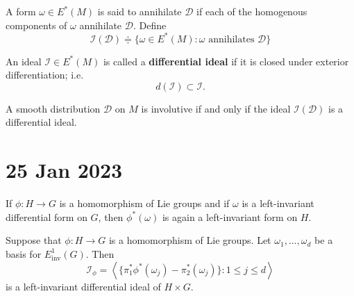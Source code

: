 \documentclass[11pt,a4paper]{scrarticle}
\theoremstyle{definition}
\theoremstyle{greenbox}
\newcommand{\define}{\doteqdot}
\begin{document}
    A form $ \omega \in E^{*}(M)  $ is said to annihilate $ \mathscr{D} $ if each of the homogenous components of $ \omega $ annihilate $ \mathscr{D} $. Define 
    \[ \mathscr{I}( \mathscr{D})  \define \{ \omega \in E^{*}(M): \omega \text{ annihilates }\mathscr{D}\}\]
    

    \begin{defn}
        An ideal $ \mathscr{I} \in E^{*}(M) $ is called a \textbf{differential ideal} if it is closed under exterior differentiation; i.e. 
        \[ d (\mathscr{I}) \subset \mathscr{I} .\]
    \end{defn}
    \begin{thm}
        A smooth distribution $ \mathscr{D} $ on $ M $ is involutive if and only if the ideal $ \mathscr{I}( \mathscr{D}) $ is a differential ideal.
    \end{thm}
    \section{25 Jan 2023}
    \vspace{0.5cm}
    \begin{thm}
        If $ \phi :H \to G  $ is a homomorphism of Lie groups and if $ \omega  $ is a left-invariant differential form on $ G $, then $ \phi^{*}(\omega ) $ is again a left-invariant form on $ H $.
    \end{thm}

    Suppose that $ \phi : H \to G $ is a homomorphism of Lie groups. Let $ \omega_{1}, \ldots, \omega_{d} $ be a basis for $ E^{1}_{\text{inv}}(G) $. Then 
    \[ \mathcal{I}_{\phi} = \left< \{\pi_{1}^{*}\phi^{*}(\omega_{j}) - \pi_{2}^{*}(\omega_{j})\} : 1 \le j \le d \right> \]
    is a left-invariant differential ideal of $ H \times G $.
\end{document}
